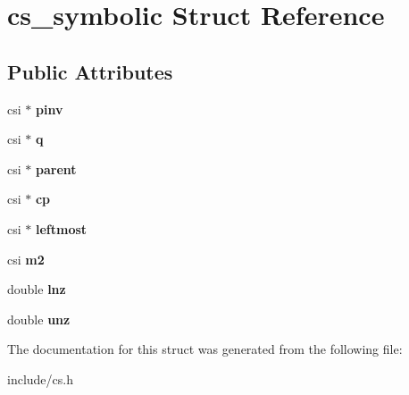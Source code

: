 \hypertarget{structcs__symbolic}{\section{cs\+\_\+symbolic Struct Reference}
\label{structcs__symbolic}
}
\subsection*{Public Attributes}
\begin{DoxyCompactItemize}
\item 
\hypertarget{structcs__symbolic_aaec943329f58d681893838030e3e273c}{csi $\ast$ {\bfseries pinv}}\label{structcs__symbolic_aaec943329f58d681893838030e3e273c}

\item 
\hypertarget{structcs__symbolic_a28f8bda67a6e43eac6bac66980f57163}{csi $\ast$ {\bfseries q}}\label{structcs__symbolic_a28f8bda67a6e43eac6bac66980f57163}

\item 
\hypertarget{structcs__symbolic_aec9034130e3a364799c96d3bae5f3809}{csi $\ast$ {\bfseries parent}}\label{structcs__symbolic_aec9034130e3a364799c96d3bae5f3809}

\item 
\hypertarget{structcs__symbolic_af019d6662511b698efe705ad93b4e27b}{csi $\ast$ {\bfseries cp}}\label{structcs__symbolic_af019d6662511b698efe705ad93b4e27b}

\item 
\hypertarget{structcs__symbolic_a06a2d29d73a501796269bc02638dbf97}{csi $\ast$ {\bfseries leftmost}}\label{structcs__symbolic_a06a2d29d73a501796269bc02638dbf97}

\item 
\hypertarget{structcs__symbolic_aa0227f03661c17f047757cad80d6f4d9}{csi {\bfseries m2}}\label{structcs__symbolic_aa0227f03661c17f047757cad80d6f4d9}

\item 
\hypertarget{structcs__symbolic_a4f723af5f9ae0047f678a82a146d17b0}{double {\bfseries lnz}}\label{structcs__symbolic_a4f723af5f9ae0047f678a82a146d17b0}

\item 
\hypertarget{structcs__symbolic_a75ba99f8c206d85c4936e11053e7f5e3}{double {\bfseries unz}}\label{structcs__symbolic_a75ba99f8c206d85c4936e11053e7f5e3}

\end{DoxyCompactItemize}


The documentation for this struct was generated from the following file\+:\begin{DoxyCompactItemize}
\item 
include/cs.\+h\end{DoxyCompactItemize}

